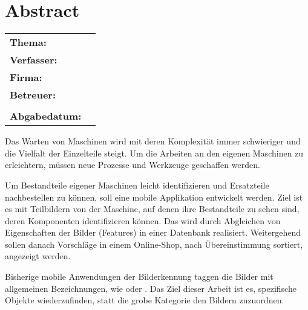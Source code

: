 \documentclass[../find-a-part.tex]{subfiles}
\begin{document}
\chapter*{Abstract}

\begin{center}
	\begin{tabular}{ll}
		\textbf{Thema:} 		& \topic\\
		\textbf{Verfasser:} 	& \authorName\\
		\textbf{Firma:} 		& \companyName\\
		\textbf{Betreuer:}		& \proffessor\\
								& \carer\\
		\textbf{Abgabedatum:}	& \closingdate\\
	\end{tabular}
\end{center}

\bigskip
Das Warten von Maschinen wird mit deren Komplexität immer schwieriger und die Vielfalt der Einzelteile steigt. Um die Arbeiten an den eigenen Maschinen zu erleichtern, müssen neue Prozesse und Werkzeuge geschaffen werden.

Um Bestandteile eigener Maschinen leicht identifizieren und Ersatzteile nachbestellen zu können, soll eine mobile Applikation entwickelt werden. Ziel ist es mit Teilbildern von der Maschine, auf denen ihre Bestandteile zu sehen sind, deren Komponenten identifizieren können. Das wird durch Abgleichen von Eigenschaften der Bilder (Features) in einer Datenbank realisiert. Weitergehend sollen danach Vorschläge in einem Online-Shop, nach Übereinstimmung sortiert, angezeigt werden.

Bisherige mobile Anwendungen der Bilderkennung taggen die Bilder mit allgemeinen Bezeichnungen, wie  oder . Das Ziel dieser Arbeit ist es, spezifische Objekte wiederzufinden, statt die grobe Kategorie den Bildern zuzuordnen.
\newpage
\end{document}
